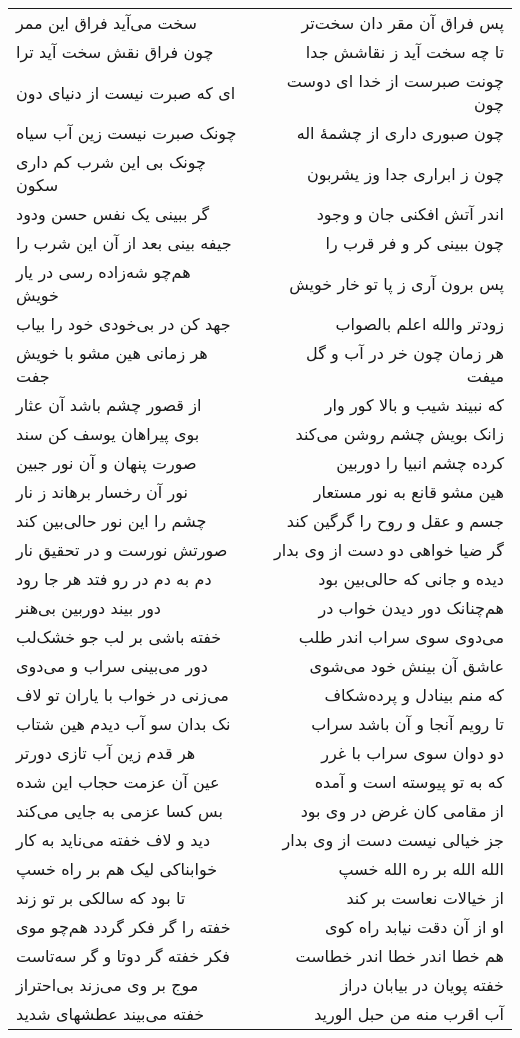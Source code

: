 \begin{center}
\begin{longtable}{l p{0.5cm} r}
سخت می‌آید فراق این ممر
&&
پس فراق آن مقر دان سخت‌تر
\\
چون فراق نقش سخت آید ترا
&&
تا چه سخت آید ز نقاشش جدا
\\
ای که صبرت نیست از دنیای دون
&&
چونت صبرست از خدا ای دوست چون
\\
چونک صبرت نیست زین آب سیاه
&&
چون صبوری داری از چشمهٔ اله
\\
چونک بی این شرب کم داری سکون
&&
چون ز ابراری جدا وز یشربون
\\
گر ببینی یک نفس حسن ودود
&&
اندر آتش افکنی جان و وجود
\\
جیفه بینی بعد از آن این شرب را
&&
چون ببینی کر و فر قرب را
\\
هم‌چو شه‌زاده رسی در یار خویش
&&
پس برون آری ز پا تو خار خویش
\\
جهد کن در بی‌خودی خود را بیاب
&&
زودتر والله اعلم بالصواب
\\
هر زمانی هین مشو با خویش جفت
&&
هر زمان چون خر در آب و گل میفت
\\
از قصور چشم باشد آن عثار
&&
که نبیند شیب و بالا کور وار
\\
بوی پیراهان یوسف کن سند
&&
زانک بویش چشم روشن می‌کند
\\
صورت پنهان و آن نور جبین
&&
کرده چشم انبیا را دوربین
\\
نور آن رخسار برهاند ز نار
&&
هین مشو قانع به نور مستعار
\\
چشم را این نور حالی‌بین کند
&&
جسم و عقل و روح را گرگین کند
\\
صورتش نورست و در تحقیق نار
&&
گر ضیا خواهی دو دست از وی بدار
\\
دم به دم در رو فتد هر جا رود
&&
دیده و جانی که حالی‌بین بود
\\
دور بیند دوربین بی‌هنر
&&
هم‌چنانک دور دیدن خواب در
\\
خفته باشی بر لب جو خشک‌لب
&&
می‌دوی سوی سراب اندر طلب
\\
دور می‌بینی سراب و می‌دوی
&&
عاشق آن بینش خود می‌شوی
\\
می‌زنی در خواب با یاران تو لاف
&&
که منم بینادل و پرده‌شکاف
\\
نک بدان سو آب دیدم هین شتاب
&&
تا رویم آنجا و آن باشد سراب
\\
هر قدم زین آب تازی دورتر
&&
دو دوان سوی سراب با غرر
\\
عین آن عزمت حجاب این شده
&&
که به تو پیوسته است و آمده
\\
بس کسا عزمی به جایی می‌کند
&&
از مقامی کان غرض در وی بود
\\
دید و لاف خفته می‌ناید به کار
&&
جز خیالی نیست دست از وی بدار
\\
خوابناکی لیک هم بر راه خسپ
&&
الله الله بر ره الله خسپ
\\
تا بود که سالکی بر تو زند
&&
از خیالات نعاست بر کند
\\
خفته را گر فکر گردد هم‌چو موی
&&
او از آن دقت نیابد راه کوی
\\
فکر خفته گر دوتا و گر سه‌تاست
&&
هم خطا اندر خطا اندر خطاست
\\
موج بر وی می‌زند بی‌احتراز
&&
خفته پویان در بیابان دراز
\\
خفته می‌بیند عطشهای شدید
&&
آب اقرب منه من حبل الورید
\\
\end{longtable}
\end{center}
